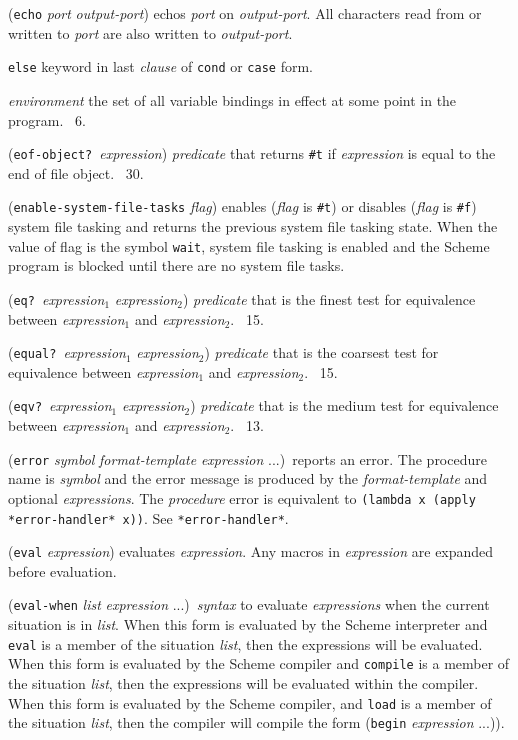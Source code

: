 \documentclass[10pt,twocolumn]{article}
\begin{document}
(\texttt{echo} \emph{port} \emph{output-port}) echos \emph{port} on
\emph{output-port}.  All characters read from or written to
\emph{port} are also written to \emph{output-port}.

\texttt{else} keyword in last \emph{clause} of \texttt{cond} or
\texttt{case} form.

\emph{environment} the set of all variable bindings in effect at some
point in the program.  \RRRRRS~6.

(\texttt{eof-object?}\ \emph{expression}) \emph{predicate} that
returns \texttt{\#t} if \emph{expression} is equal to the end of file
object.  \RRRRRS~30.

(\texttt{enable-system-file-tasks} \emph{flag}) enables (\emph{flag}
is \texttt{\#t}) or disables (\emph{flag} is \texttt{\#f}) system file
tasking and returns the previous system file tasking state.  When the
value of flag is the symbol \texttt{wait}, system file tasking is
enabled and the Scheme program is blocked until there are no system
file tasks.

(\texttt{eq?}\ \emph{expression}$_1$ \emph{expression}$_2$)
\emph{predicate} that is the finest test for equivalence between
\emph{expression}$_1$ and \emph{expression}$_2$.  \RRRRRS~15.

(\texttt{equal?}\ \emph{expression}$_1$ \emph{expression}$_2$)
\emph{predicate} that is the coarsest test for equivalence between
\emph{expression}$_1$ and \emph{expression}$_2$.  \RRRRRS~15.

(\texttt{eqv?}\ \emph{expression}$_1$ \emph{expression}$_2$)
\emph{predicate} that is the medium test for equivalence between
\emph{expression}$_1$ and \emph{expression}$_2$.  \RRRRRS~13.

(\texttt{error} \emph{symbol} \emph{format-template} \emph{expression}
...)\ reports an error.  The procedure name is \emph{symbol} and the
error message is produced by the \emph{format-template} and optional
\emph{expressions}.  The \emph{procedure} error is equivalent to
\texttt{(lambda x (apply *error-handler* x))}.  See
\texttt{*error-handler*}.

(\texttt{eval} \emph{expression}) evaluates \emph{expression}.  Any
macros in \emph{expression} are expanded before evaluation.

(\texttt{eval-when} \emph{list} \emph{expression} ...)\ \emph{syntax}
to evaluate \emph{expressions} when the current situation is in
\emph{list}.  When this form is evaluated by the Scheme interpreter
and \texttt{eval} is a member of the situation \emph{list}, then the
expressions will be evaluated.  When this form is evaluated by the
Scheme compiler and \texttt{compile} is a member of the situation
\emph{list}, then the expressions will be evaluated within the
compiler.  When this form is evaluated by the Scheme compiler, and
\texttt{load} is a member of the situation \emph{list}, then the
compiler will compile the form (\texttt{begin} \emph{expression}
...)).
\end{document}
